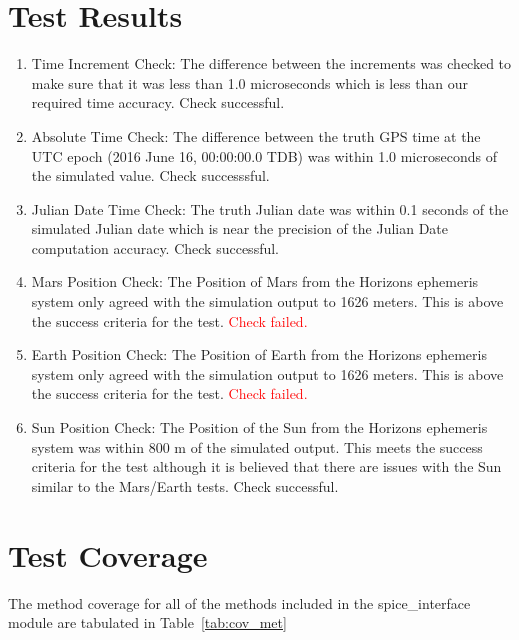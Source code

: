 \documentclass[]{LASPreport}
\begin{document}
{\section{Test Results}
\begin{enumerate}
\item{Time Increment Check: The difference between the increments was checked 
   to make sure that it was less than 1.0 microseconds which is less than our 
   required time accuracy.  Check successful.}
\item{Absolute Time Check: The difference between the truth GPS time at the UTC 
   epoch (2016 June 16, 00:00:00.0 TDB) was within 1.0 microseconds of the 
   simulated value.  Check successsful.}
\item{Julian Date Time Check: The truth Julian date was within 0.1 seconds of 
   the simulated Julian date which is near the precision of the Julian Date 
   computation accuracy.  Check successful.}
\item{Mars Position Check:  The Position of Mars from the Horizons ephemeris 
   system only agreed with the simulation output to 1626 meters.  This is above 
   the success criteria for the test.  \textcolor{red}{Check failed.}}
\item{Earth Position Check:  The Position of Earth from the Horizons ephemeris 
   system only agreed with the simulation output to 1626 meters.  This is above 
   the success criteria for the test.  \textcolor{red}{Check failed.}}
\item{Sun Position Check: The Position of the Sun from the Horizons ephemeris 
   system was within 800 m of the simulated output.  This meets the success 
   criteria for the test although it is believed that there are issues with the 
   Sun similar to the Mars/Earth tests. Check successful.}
\end{enumerate}

\section{Test Coverage}
The method coverage for all of the methods included in the spice\_interface 
module are tabulated in Table~\ref{tab:cov_met}

}
\end{document}
